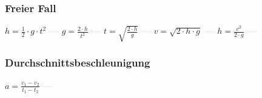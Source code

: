 \subsubsection{Freier Fall} 
\begin{minipage}{0.45\textwidth} 
\end{minipage} 
\begin{minipage}{0.45\textwidth} 
 
\end{minipage} 
$ h = \frac{1}{2}\cdot g\cdot t^{2} $ \textcolor{lightgray}{\textbf{---}} 
$ g = \frac{2\cdot h}{ t^{2} } $ \textcolor{lightgray}{\textbf{---}} 
$ t = \sqrt{\frac{2\cdot h}{g}} $ \textcolor{lightgray}{\textbf{---}} 
$ v = \sqrt{2\cdot h\cdot g} $ \textcolor{lightgray}{\textbf{---}} 
$ h = \frac{ v^{2} }{2\cdot g} $ \textcolor{lightgray}{\textbf{---}} 

\subsubsection{Durchschnittsbeschleunigung} 
\begin{minipage}{0.45\textwidth} 
\end{minipage} 
\begin{minipage}{0.45\textwidth} 
 
\end{minipage} 
$ a = \frac{v_{1}  - v_{2} }{t_{1}  - t_{2} } $ \textcolor{lightgray}{\textbf{---}} 

